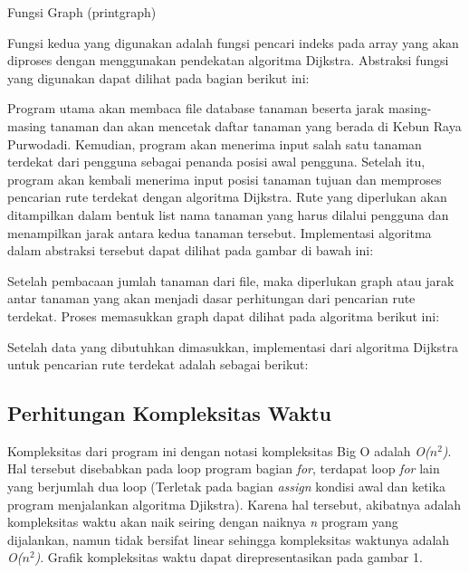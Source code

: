\documentclass[conference]{IEEEtran}
\begin{document}
\begin{algorithm}
\caption{Fungsi Graph (printgraph)}



\end{algorithm}

Fungsi kedua yang digunakan adalah fungsi pencari indeks pada array yang akan diproses dengan menggunakan pendekatan algoritma Dijkstra. Abstraksi fungsi yang digunakan dapat dilihat pada bagian berikut ini:

Program utama akan membaca ﬁle database tanaman beserta jarak masing-masing tanaman dan akan mencetak daftar tanaman yang berada di Kebun Raya Purwodadi. Kemudian, program akan menerima input salah satu tanaman terdekat dari pengguna sebagai penanda posisi awal pengguna. Setelah itu, program akan kembali menerima input posisi tanaman tujuan dan memproses pencarian rute terdekat dengan algoritma Dijkstra. Rute yang diperlukan akan ditampilkan dalam bentuk list nama tanaman yang harus dilalui pengguna dan menampilkan jarak antara kedua tanaman tersebut. Implementasi algoritma dalam abstraksi tersebut dapat dilihat pada gambar di bawah ini:

Setelah pembacaan jumlah tanaman dari ﬁle, maka diperlukan graph atau jarak antar tanaman yang akan menjadi dasar perhitungan dari pencarian rute terdekat. Proses memasukkan graph dapat dilihat pada algoritma berikut ini:

Setelah data yang dibutuhkan dimasukkan, implementasi dari algoritma Dijkstra untuk pencarian rute terdekat adalah sebagai berikut:

\subsection{Perhitungan Kompleksitas Waktu}
Kompleksitas dari program ini dengan notasi kompleksitas Big O adalah\textit{ O($n^2$)}. Hal tersebut disebabkan pada loop program bagian \textit{for}, terdapat loop \textit{for} lain yang berjumlah dua loop (Terletak pada bagian \textit{assign} kondisi awal dan ketika program menjalankan algoritma Djikstra). Karena hal tersebut, akibatnya adalah kompleksitas waktu akan naik seiring dengan naiknya \textit{n} program yang dijalankan, namun tidak bersifat linear sehingga kompleksitas waktunya adalah \textit{O($n^2$)}. Graﬁk kompleksitas waktu dapat direpresentasikan pada gambar 1.
\end{document}
